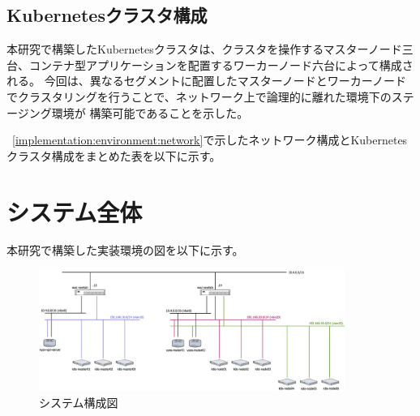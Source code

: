 \subsection{Kubernetesクラスタ構成}
\label{implementation:environment:kubernetes}
本研究で構築したKubernetesクラスタは、クラスタを操作するマスターノード三台、コンテナ型アプリケーションを配置するワーカーノード六台によって構成される。
今回は、異なるセグメントに配置したマスターノードとワーカーノードでクラスタリングを行うことで、ネットワーク上で論理的に離れた環境下のステージング環境が
構築可能であることを示した。

~\ref{implementation:environment:network}で示したネットワーク構成とKubernetesクラスタ構成をまとめた表を以下に示す。

\section{システム全体}
本研究で構築した実装環境の図を以下に示す。

\begin{figure}[htbp]
\begin{center}
\includegraphics[width=100mm]{./figures/system-diagram.jpg}
\caption{システム構成図}
\end{center}
\end{figure}

